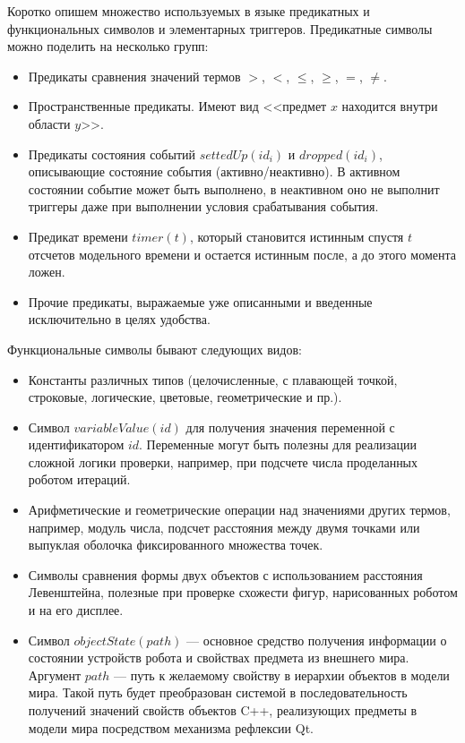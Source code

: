 \documentclass[conference]{IEEEtran}
\begin{document}
Коротко опишем множество используемых в языке предикатных и функциональных символов и элементарных триггеров. Предикатные символы можно поделить на несколько групп:
\begin{itemize}
    \item Предикаты сравнения значений термов $>$, $<$, $\leq$, $\geq$, $=$, $\neq$.
    \item Пространственные предикаты. Имеют вид <<предмет $x$ находится внутри области $y$>>.
    \item Предикаты состояния событий $settedUp(id_i)$ и $dropped(id_i)$, описывающие состояние события 
            (активно/неактивно). В активном состоянии событие может быть выполнено, в неактивном оно не выполнит триггеры даже при выполнении условия срабатывания события.
    \item Предикат времени $timer(t)$, который становится истинным спустя $t$ отсчетов модельного времени и остается истинным после, а до этого момента ложен.
    \item Прочие предикаты, выражаемые уже описанными и введенные исключительно в целях удобства.
\end{itemize}

Функциональные символы бывают следующих видов:
\begin{itemize}
    \item Константы различных типов (целочисленные, с плавающей точкой, строковые, логические, цветовые, геометрические и пр.).
    \item Символ $variableValue(id)$ для получения значения переменной с идентификатором $id$. Переменные могут быть полезны для реализации сложной логики проверки, например, при подсчете числа проделанных роботом итераций.
    \item Арифметические и геометрические операции над значениями других термов, например, модуль числа, подсчет расстояния между двумя точками или выпуклая оболочка фиксированного множества точек.
    \item Символы сравнения формы двух объектов с использованием расстояния Левенштейна, полезные при проверке схожести фигур, нарисованных роботом и на его дисплее.
    \item Символ $objectState(path)$ --- основное средство получения информации о состоянии устройств робота и свойствах предмета из внешнего мира. Аргумент $path$ --- путь к желаемому свойству в иерархии объектов в модели мира. Такой путь будет преобразован системой в последовательность получений значений свойств объектов C++, реализующих предметы в модели мира посредством механизма рефлексии Qt.
\end{itemize}
\end{document}
